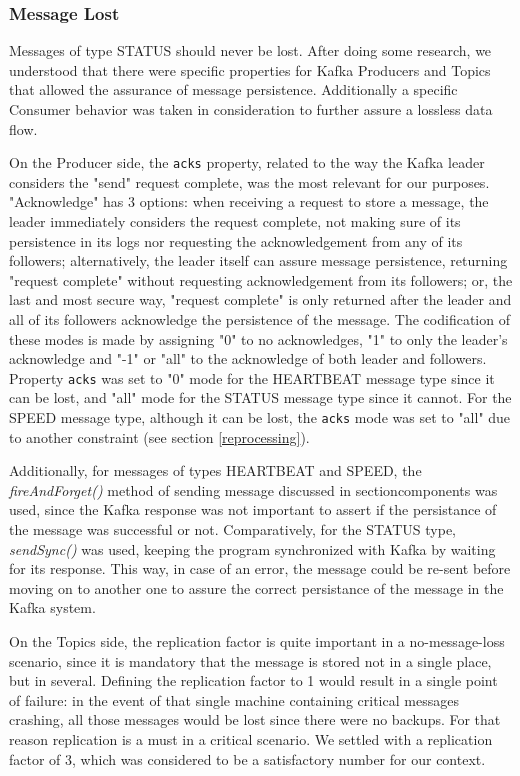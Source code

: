\documentclass[12pt]{article}
\begin{document}
\subsubsection{Message Lost}\label{lost}

Messages of type STATUS should never be lost.
After doing some research, we understood that there were specific properties for Kafka Producers and Topics that allowed the assurance of message persistence.
Additionally a specific Consumer behavior was taken in consideration to further assure a lossless data flow.

On the Producer side, the \texttt{acks} property, related to the way the Kafka leader considers the "send" request complete, was the most relevant for our purposes. 
"Acknowledge" has 3 options: 
when receiving a request to store a message, the leader immediately considers the request complete, not making sure of its persistence in its logs nor requesting 
the acknowledgement from any of its followers; 
alternatively, the leader itself can assure message persistence, returning "request complete" without requesting acknowledgement from its followers; 
or, the last and most secure way, "request complete" is only returned after the leader and all of its followers acknowledge the persistence of the message. 
The codification of these modes is made by assigning "0" to no acknowledges, "1" to only the leader's acknowledge and "-1" or "all" to the acknowledge of both 
leader and followers. 
Property \texttt{acks} was set to "0" mode for the HEARTBEAT message type since it can be lost, and "all" mode for the STATUS message type since it cannot. 
For the SPEED message type, although it can be lost, the \texttt{acks} mode was set to "all" due to another constraint (see section \ref{reprocessing}).

Additionally, for messages of types HEARTBEAT and SPEED, the \textit{fireAndForget()} method of sending message discussed in section{components} was used, since 
the Kafka response was not important to assert if the persistance of the message was successful or not.
Comparatively, for the STATUS type, \textit{sendSync()} was used, keeping the program synchronized with Kafka by waiting for its response.
This way, in case of an error, the message could be re-sent before moving on to another one to assure the correct persistance of the message in the Kafka system.

On the Topics side, the replication factor is quite important in a no-message-loss scenario, since it is mandatory that the message is stored not in a single 
place, but in several.
Defining the replication factor to 1 would result in a single point of failure: in the event of that single machine containing critical messages crashing, all 
those messages would be lost since there were no backups. 
For that reason replication is a must in a critical scenario. 
We settled with a replication factor of 3, which was considered to be a satisfactory number for our context.
\end{document}
